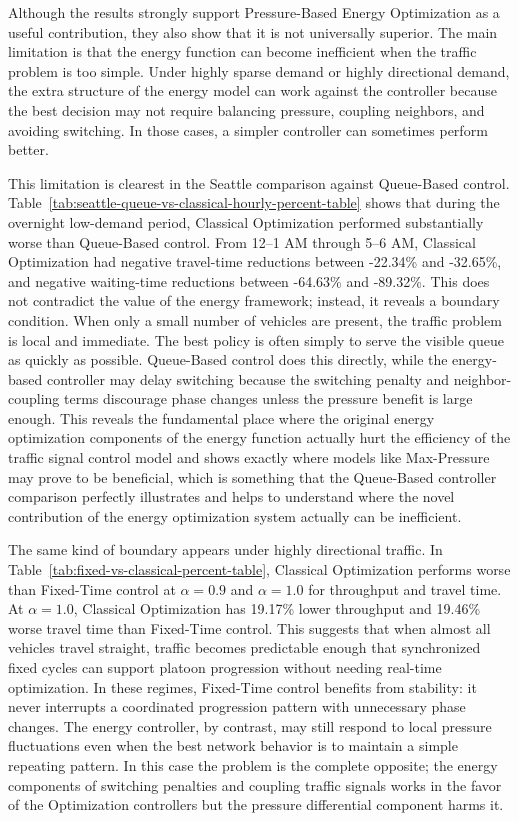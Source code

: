 \documentclass[12pt]{article}
\begin{document}
Although the results strongly support Pressure-Based Energy Optimization as a useful contribution, they also show that it is not universally superior. The main limitation is that the energy function can become inefficient when the traffic problem is too simple. Under highly sparse demand or highly directional demand, the extra structure of the energy model can work against the controller because the best decision may not require balancing pressure, coupling neighbors, and avoiding switching. In those cases, a simpler controller can sometimes perform better.

This limitation is clearest in the Seattle comparison against Queue-Based control. Table~\ref{tab:seattle-queue-vs-classical-hourly-percent-table} shows that during the overnight low-demand period, Classical Optimization performed substantially worse than Queue-Based control. From 12--1 AM through 5--6 AM, Classical Optimization had negative travel-time reductions between -22.34\% and -32.65\%, and negative waiting-time reductions between -64.63\% and -89.32\%. This does not contradict the value of the energy framework; instead, it reveals a boundary condition. When only a small number of vehicles are present, the traffic problem is local and immediate. The best policy is often simply to serve the visible queue as quickly as possible. Queue-Based control does this directly, while the energy-based controller may delay switching because the switching penalty and neighbor-coupling terms discourage phase changes unless the pressure benefit is large enough. This reveals the fundamental place where the original energy optimization components of the energy function actually hurt the efficiency of the traffic signal control model and shows exactly where models like Max-Pressure~\cite{varaiya2013}  may prove to be beneficial, which is something that the Queue-Based controller comparison perfectly illustrates and helps to understand where the novel contribution of the energy optimization system actually can be inefficient.

The same kind of boundary appears under highly directional traffic. In Table~\ref{tab:fixed-vs-classical-percent-table}, Classical Optimization performs worse than Fixed-Time control at $\alpha=0.9$ and $\alpha=1.0$ for throughput and travel time. At $\alpha=1.0$, Classical Optimization has 19.17\% lower throughput and 19.46\% worse travel time than Fixed-Time control. This suggests that when almost all vehicles travel straight, traffic becomes predictable enough that synchronized fixed cycles can support platoon progression without needing real-time optimization. In these regimes, Fixed-Time control benefits from stability: it never interrupts a coordinated progression pattern with unnecessary phase changes. The energy controller, by contrast, may still respond to local pressure fluctuations even when the best network behavior is to maintain a simple repeating pattern. In this case the problem is the complete opposite; the energy components of switching penalties and coupling traffic signals works in the favor of the Optimization controllers but the pressure differential component harms it.
\end{document}
